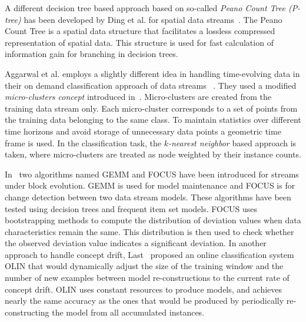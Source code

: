 A different decision tree based approach based on so-called \textit{Peano Count Tree (P-tree)} has been developed by Ding et al. for spatial data streams~\cite{ding02:peanocount}. The Peano Count Tree is a spatial data structure that facilitates a lossless compressed representation of spatial data. This structure is used for fast calculation of information gain for branching in decision trees.

Aggarwal et al. employs a slightly different idea in handling time-evolving data in their on demand classification approach of data streams ~\cite{aggarwal04:ondemand}. They used a modified \textit{micro-clusters concept} introduced in~\cite{aggarwal03:clustream}. Micro-clusters are created from the training data stream only. Each micro-cluster corresponds to a set of points from the training data belonging to the same class. To maintain statistics over different time horizons and avoid storage of unnecessary data points a geometric time frame is used. In the classification task, the \textit{$k$-nearest neighbor} based approach is taken, where micro-clusters are treated as node weighted by their instance counts. 

In~\cite{ganti02:gemm:focus} two algorithms named GEMM and FOCUS have been introduced for streams under block evolution. GEMM is used for model maintenance and FOCUS is for change detection between two data stream models. These algorithms have been tested using decision trees and frequent item set models. FOCUS uses bootstrapping methods to compute the distribution of deviation values when data characteristics remain the same. This distribution is then used to check whether the observed deviation value indicates a significant deviation. In another approach to handle concept drift, Last~\cite{last02:olin} proposed an online classification system OLIN that would dynamically adjust the size of the training window and the number of new examples between model re-constructions to the current rate of concept drift. OLIN uses constant resources to produce models, and achieves nearly the same accuracy as the ones that would be produced by periodically re-constructing the model from all accumulated instances.


